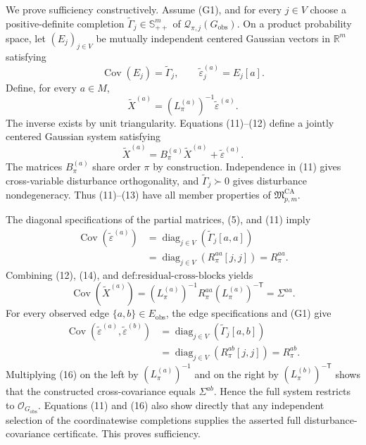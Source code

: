 We prove sufficiency constructively.  Assume (G1), and for every \(j\in V\) choose a positive-definite completion \(\widetilde\Gamma_j\in\mathbb S_{++}^m\) of \(\mathcal Q_{\pi,j}(G_{\mathrm{obs}})\).  On a product probability space, let \((E_j)_{j\in V}\) be mutually independent centered Gaussian vectors in \(\mathbb R^m\) satisfying
\[
\operatorname{Cov}(E_j)=\widetilde\Gamma_j,
\qquad
\widetilde\varepsilon_j^{(a)}=E_j[a].
\tag{11}
\]
Define, for every \(a\in M\),
\[
\widetilde X^{(a)}
=(L_\pi^{(a)})^{-1}\widetilde\varepsilon^{(a)}.
\tag{12}
\]
The inverse exists by unit triangularity.  Equations (11)--(12) define a jointly centered Gaussian system satisfying
\[
\widetilde X^{(a)}
=B_\pi^{(a)}\widetilde X^{(a)}+\widetilde\varepsilon^{(a)}.
\tag{13}
\]
The matrices \(B_\pi^{(a)}\) share order \(\pi\) by construction.  Independence in (11) gives cross-variable disturbance orthogonality, and \(\widetilde\Gamma_j\succ0\) gives disturbance nondegeneracy.  Thus (11)--(13) have all member properties of \(\mathfrak M_{p,m}^{\mathrm{CA}}\).

The diagonal specifications of the partial matrices, (5), and (11) imply
\[
\begin{aligned}
\operatorname{Cov}(\widetilde\varepsilon^{(a)})
&=\operatorname{diag}_{j\in V}(\widetilde\Gamma_j[a,a])\\
&=\operatorname{diag}_{j\in V}(R_\pi^{aa}[j,j])
=R_\pi^{aa}.
\end{aligned}
\tag{14}
\]
Combining (12), (14), and \(\text{def:residual-cross-blocks}\) yields
\[
\operatorname{Cov}(\widetilde X^{(a)})
=(L_\pi^{(a)})^{-1}R_\pi^{aa}(L_\pi^{(a)})^{-\mathsf T}
=\Sigma^{aa}.
\tag{15}
\]
For every observed edge \(\{a,b\}\in E_{\mathrm{obs}}\), the edge specifications and (G1) give
\[
\begin{aligned}
\operatorname{Cov}(\widetilde\varepsilon^{(a)},\widetilde\varepsilon^{(b)})
&=\operatorname{diag}_{j\in V}(\widetilde\Gamma_j[a,b])\\
&=\operatorname{diag}_{j\in V}(R_\pi^{ab}[j,j])
=R_\pi^{ab}.
\end{aligned}
\tag{16}
\]
Multiplying (16) on the left by \((L_\pi^{(a)})^{-1}\) and on the right by \((L_\pi^{(b)})^{-\mathsf T}\) shows that the constructed cross-covariance equals \(\Sigma^{ab}\).  Hence the full system restricts to \(\mathcal O_{G_{\mathrm{obs}}}\).  Equations (11) and (16) also show directly that any independent selection of the coordinatewise completions supplies the asserted full disturbance-covariance certificate.  This proves sufficiency.

